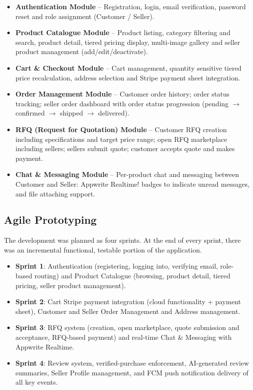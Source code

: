 \begin{itemize}
    \item \textbf{Authentication Module} -- Registration, login, email verification, password reset and role assignment (Customer / Seller).
    \item \textbf{Product Catalogue Module} -- Product listing, category filtering and search, product detail, tiered pricing display, multi-image gallery and seller product management (add/edit/deactivate).
    \item \textbf{Cart \& Checkout Module} -- Cart management, quantity sensitive tiered price recalculation, address selection and Stripe payment sheet integration.
    \item \textbf{Order Management Module} -- Customer order history; order status tracking; seller order dashboard with order status progression (pending $\to$ confirmed $\to$ shipped $\to$ delivered).
    \item \textbf{RFQ (Request for Quotation) Module} -- Customer RFQ creation including specifications and target price range; open RFQ marketplace including sellers; sellers submit quote; customer accepts quote and makes payment.
    \item \textbf{Chat \& Messaging Module} -- Per-product chat and messaging between Customer and Seller: Appwrite Realtime! badges to indicate unread messages, and file attaching support.
\end{itemize}

\subsection{Agile Prototyping}
The development was planned as four sprints. At the end of every sprint, there was an incremental functional, testable portion of the application.

\begin{itemize}
    \item \textbf{Sprint 1}: Authentication (registering, logging into, verifying email, role-based routing) and Product Catalogue (browsing, product detail, tiered pricing, seller product management).
    
    \item \textbf{Sprint 2}: Cart Stripe payment integration (cloud functionality + payment sheet), Customer and Seller Order Management and Address management.
    
    \item \textbf{Sprint 3}: RFQ system (creation, open marketplace, quote submission and acceptance, RFQ-based payment) and real-time Chat \& Messaging with Appwrite Realtime.
    
    \item \textbf{Sprint 4}: Review system, verified-purchase enforcement, AI-generated review summaries, Seller Profile management, and FCM push notification delivery of all key events.
\end{itemize}

